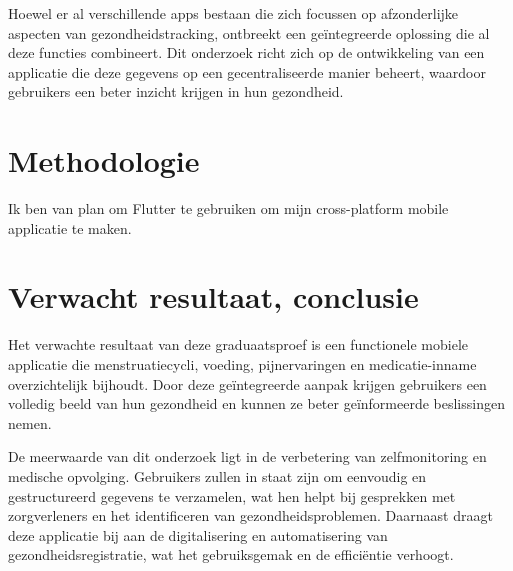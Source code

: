 Hoewel er al verschillende apps bestaan die zich focussen op afzonderlijke aspecten van gezondheidstracking, ontbreekt een geïntegreerde oplossing die al deze functies combineert. Dit onderzoek richt zich op de ontwikkeling van een applicatie die deze gegevens op een gecentraliseerde manier beheert, waardoor gebruikers een beter inzicht krijgen in hun gezondheid.

\section{Methodologie}%
\label{sec:methodologie}
Ik ben van plan om Flutter te gebruiken om mijn cross-platform mobile applicatie te maken.
\section{Verwacht resultaat, conclusie}%
\label{sec:verwachte_resultaten}

Het verwachte resultaat van deze graduaatsproef is een functionele mobiele applicatie die menstruatiecycli, voeding, pijnervaringen en medicatie-inname overzichtelijk bijhoudt. Door deze geïntegreerde aanpak krijgen gebruikers een volledig beeld van hun gezondheid en kunnen ze beter geïnformeerde beslissingen nemen.

De meerwaarde van dit onderzoek ligt in de verbetering van zelfmonitoring en medische opvolging. Gebruikers zullen in staat zijn om eenvoudig en gestructureerd gegevens te verzamelen, wat hen helpt bij gesprekken met zorgverleners en het identificeren van gezondheidsproblemen. Daarnaast draagt deze applicatie bij aan de digitalisering en automatisering van gezondheidsregistratie, wat het gebruiksgemak en de efficiëntie verhoogt.